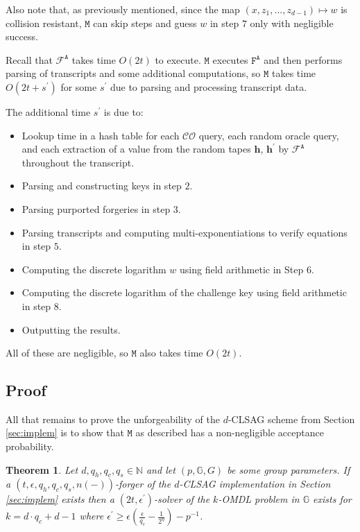 \documentclass{mrl}
\theoremstyle{plain}
\newtheorem{theorem}{Theorem}[section]
\theoremstyle{definition}
\begin{document}
Also note that, as previously mentioned, since the map $(x, z_1, \ldots, z_{d-1}) \mapsto w$ is collision resistant, $\texttt{M}$ can skip steps and guess $w$ in step $7$ only with negligible success.

Recall that $\mathcal{F}^{\texttt{A}}$ takes time $O(2t)$ to execute. $\texttt{M}$ executes $\texttt{F}^{\texttt{A}}$ and then performs parsing of transcripts and some additional computations, so $\texttt{M}$ takes time $O(2t+s^\prime)$ for some $s^\prime$ due to parsing and processing transcript data.

The additional time $s^\prime$ is due to: 
\begin{itemize}
\item Lookup time in a hash table for each $\mathcal{CO}$ query, each random oracle query, and each extraction of a value from the random tapes $\textbf{h}$, $\textbf{h}^\prime$ by $\mathcal{F}^{\texttt{A}}$ throughout the transcript.
\item Parsing and constructing keys in step $2$.
\item Parsing purported forgeries in step $3$.
\item Parsing transcripts and computing multi-exponentiations to verify equations in step $5$.
\item Computing the discrete logarithm $w$ using field arithmetic in Step $6$.
\item Computing the discrete logarithm of the challenge key using field arithmetic in step $8$.
\item Outputting the results.
\end{itemize}
All of these are negligible, so $\texttt{M}$ also takes time $O(2t)$.


\subsection{Proof}
All that remains to prove the unforgeability of the $d$-CLSAG scheme from Section \ref{sec:implem} is to show that $\texttt{M}$ as described has a non-negligible acceptance probability.

\begin{theorem}
Let $d, q_h, q_c, q_s \in \mathbb{N}$  and let $(p,\mathbb{G},G)$ be some group parameters. If a $(t, \epsilon, q_h, q_c, q_s, n(-))$-forger of the $d$-CLSAG implementation in Section \ref{sec:implem} exists then a $(2t, \epsilon^\prime)$-solver of the $k$-OMDL problem in $\mathbb{G}$ exists for $k = d\cdot q_c + d - 1$ where $\epsilon^\prime \geq \epsilon\left(\frac{\epsilon}{q_c} - \frac{1}{2^\eta}\right) - p^{-1}$.
\end{theorem}
\end{document}
